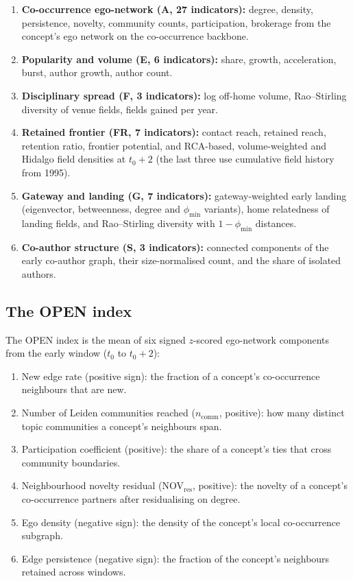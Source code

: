 \documentclass[11pt,letterpaper]{article}
\begin{document}
\begin{enumerate}
    \item \textbf{Co-occurrence ego-network (A, 27 indicators):} degree, density, persistence, novelty, community counts, participation, brokerage from the concept's ego network on the co-occurrence backbone.
    \item \textbf{Popularity and volume (E, 6 indicators):} share, growth, acceleration, burst, author growth, author count.
    \item \textbf{Disciplinary spread (F, 3 indicators):} log off-home volume, Rao--Stirling diversity of venue fields, fields gained per year.
    \item \textbf{Retained frontier (FR, 7 indicators):} contact reach, retained reach, retention ratio, frontier potential, and RCA-based, volume-weighted and Hidalgo field densities at $t_0{+}2$ (the last three use cumulative field history from 1995).
    \item \textbf{Gateway and landing (G, 7 indicators):} gateway-weighted early landing (eigenvector, betweenness, degree and $\phi_{\min}$ variants), home relatedness of landing fields, and Rao--Stirling diversity with $1-\phi_{\min}$ distances.
    \item \textbf{Co-author structure (S, 3 indicators):} connected components of the early co-author graph, their size-normalised count, and the share of isolated authors.
\end{enumerate}

\subsection{The OPEN index}

The OPEN index is the mean of six signed $z$-scored ego-network components from the early window ($t_0$ to $t_0 + 2$):

\begin{enumerate}
    \item New edge rate (positive sign): the fraction of a concept's co-occurrence neighbours that are new.
    \item Number of Leiden communities reached ($n_{\text{comm}}$, positive): how many distinct topic communities a concept's neighbours span.
    \item Participation coefficient (positive): the share of a concept's ties that cross community boundaries.
    \item Neighbourhood novelty residual (NOV$_{\text{res}}$, positive): the novelty of a concept's co-occurrence partners after residualising on degree.
    \item Ego density (negative sign): the density of the concept's local co-occurrence subgraph.
    \item Edge persistence (negative sign): the fraction of the concept's neighbours retained across windows.
\end{enumerate}
\end{document}
